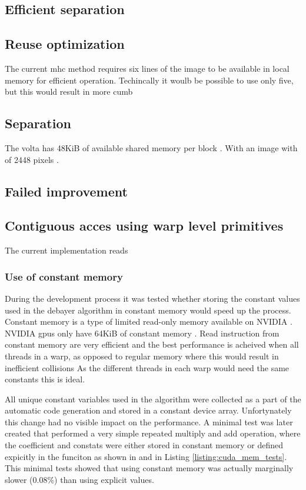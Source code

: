 \subsection{Efficient separation}


\subsection{Reuse optimization}
The current \gls{mhc} method requires six lines of the image to be available in local memory for efficient operation.
Techincally it woulb be possible to use only five, but this would result in more cumb

\subsection{Separation}
The \gls{volta} has 48KiB of available shared memory per block \cite{rigerunNVIDIAJetsonXavier2023}.
With an image with of 2448 pixels \cite{lucidvisionlabsTriton0MPPolarization}.

\subsection{Failed improvement}

\subsection{Contiguous acces using warp level primitives}
The current implementation reads

\subsubsection{Use of constant memory}
During the development process it was tested whether storing the constant values used in the debayer algorithm in constant memory would speed up the process.
Constant memory is a type of limited read-only memory available on NVIDIA  \cite[61]{nvidiaCUDABestPractices2023}.
NVIDIA \glspl{gpu} only have 64KiB of constant memory \cite[61]{nvidiaCUDABestPractices2023}.
Read instruction from constant memory are very efficient and the best performance is acheived when all threads in a warp, as opposed to regular memory where this would result in inefficient collisions \cite[61]{nvidiaCUDABestPractices2023} \cite[13,14]{volkovLatencyHiding2016}
As the different threads in each warp would need the same constants this is ideal.

All unique constant variables used in the algorithm were collected as a part of the automatic code generation and stored in a constant device array.
Unfortynately this change had no visible impact on the performance.
A minimal test was later created that performed a very simple repeated multiply and add operation, where the coefficient and constats were either stored in constant memory or defined expicitly in the funciton as shown in  and  in Listing \ref{listing:cuda_mem_tests}.
This minimal tests showed that using constant memory was actually marginally slower (0.08\%) than using explicit values.


